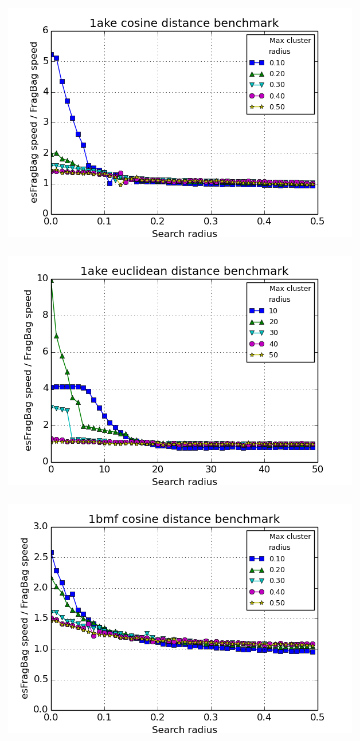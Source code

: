 \documentclass[review,preprint,12pt]{elsarticle}
\theoremstyle{definition}
\theoremstyle{remark}
\numberwithin{equation}{section}
\begin{document}
\begin{figure}[tbp]
\begin{subfigure}[b]{0.38\textwidth}
    \end{subfigure}
    \begin{subfigure}[b]{0.38\textwidth}
        \includegraphics[width=1\textwidth]{assets/1ake_cosine.png}
    \end{subfigure}%
    \begin{subfigure}[b]{0.38\textwidth}
        \includegraphics[width=1\textwidth]{assets/1ake_euclid.png}
    \end{subfigure}
    \begin{subfigure}[b]{0.38\textwidth}
        \includegraphics[width=1\textwidth]{assets/1bmf_cosine.png}

\end{subfigure}
\end{figure}
\end{document}
